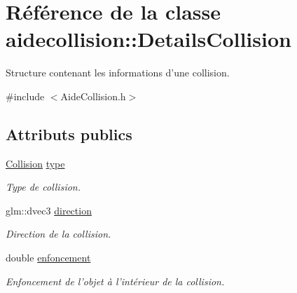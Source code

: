 \hypertarget{classaidecollision_1_1_details_collision}{\section{Référence de la classe aidecollision\-:\-:Details\-Collision}
\label{classaidecollision_1_1_details_collision}
}


Structure contenant les informations d'une collision.  




{\ttfamily \#include $<$Aide\-Collision.\-h$>$}

\subsection*{Attributs publics}
\begin{DoxyCompactItemize}
\item 
\hypertarget{classaidecollision_1_1_details_collision_a524989691331ea39d2c14c639f0de02e}{\hyperlink{namespaceaidecollision_a1c8613e2393aa3268262f9d23d60c0c9}{Collision} \hyperlink{classaidecollision_1_1_details_collision_a524989691331ea39d2c14c639f0de02e}{type}}\label{classaidecollision_1_1_details_collision_a524989691331ea39d2c14c639f0de02e}

\begin{DoxyCompactList}\small\item\em Type de collision. \end{DoxyCompactList}\item 
\hypertarget{classaidecollision_1_1_details_collision_ab68965d1c0583cc9a28973bc5b3060b8}{glm\-::dvec3 \hyperlink{classaidecollision_1_1_details_collision_ab68965d1c0583cc9a28973bc5b3060b8}{direction}}\label{classaidecollision_1_1_details_collision_ab68965d1c0583cc9a28973bc5b3060b8}

\begin{DoxyCompactList}\small\item\em Direction de la collision. \end{DoxyCompactList}\item 
\hypertarget{classaidecollision_1_1_details_collision_a6aa4cae3f313a2a16608dd60da0f97d1}{double \hyperlink{classaidecollision_1_1_details_collision_a6aa4cae3f313a2a16608dd60da0f97d1}{enfoncement}}\label{classaidecollision_1_1_details_collision_a6aa4cae3f313a2a16608dd60da0f97d1}

\begin{DoxyCompactList}\small\item\em Enfoncement de l'objet à l'intérieur de la collision. \end{DoxyCompactList}\end{DoxyCompactItemize}


